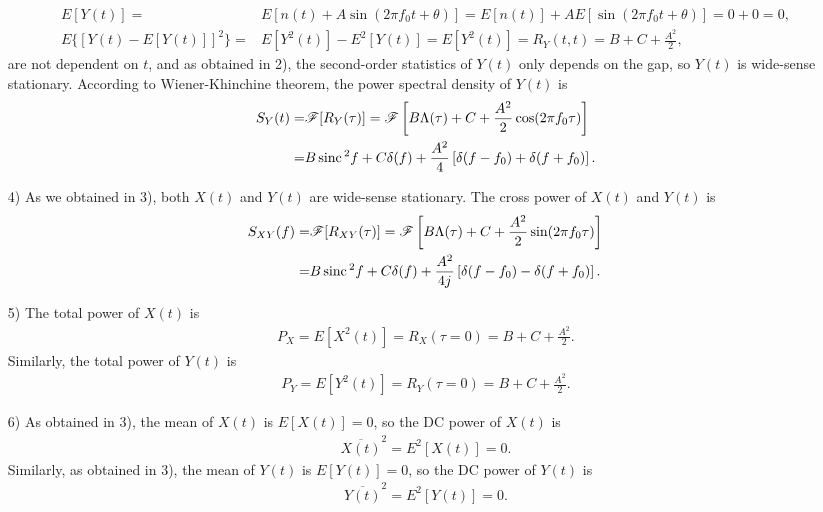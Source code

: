 \documentclass{assignment}
\begin{document}
\begin{sol}
\begin{itemize}
\begin{align}
            E[Y(t)]=&E[n(t)+A\sin(2\pi f_0t+\theta)]=E[n(t)]+AE[\sin(2\pi f_0t+\theta)]=0+0=0,\\
            E\{[Y(t)-E[Y(t)]]^2\}=&E[Y^2(t)]-E^2[Y(t)]=E[Y^2(t)]=R_Y(t,t)=B+C+\frac{A^2}{2},
        \end{align}
        are not dependent on $t$, and as obtained in 2), the second-order statistics of $Y(t)$ only depends on the gap, so $Y(t)$ is wide-sense stationary. According to Wiener-Khinchine theorem, the power spectral density of $Y(t)$ is
        \begin{align}
            \notag S_Y(t)=&\mathscr{F}[R_Y(\tau)]=\mathscr{F}\left[B\Lambda(\tau)+C+\frac{A^2}{2}\cos(2\pi f_0\tau)\right]\\
            =&B\,\text{sinc}\,^2f+C\delta(f)+\frac{A^2}{4}\left[\delta(f-f_0)+\delta(f+f_0)\right].
        \end{align}
        \item[4)] As we obtained in 3), both $X(t)$ and $Y(t)$ are wide-sense stationary. The cross power of $X(t)$ and $Y(t)$ is
        \begin{align}
            \notag S_{XY}(f)=&\mathscr{F}[R_{XY}(\tau)]=\mathscr{F}\left[B\Lambda(\tau)+C+\frac{A^2}{2}\sin(2\pi f_0\tau)\right]\\
            =&B\,\text{sinc}\,^2f+C\delta(f)+\frac{A^2}{4j}\left[\delta(f-f_0)-\delta(f+f_0)\right].
        \end{align}
        \item[5)] The total power of $X(t)$ is
        \begin{align}
            P_X=E[X^2(t)]=R_X(\tau=0)=B+C+\frac{A^2}{2}.
        \end{align}
        Similarly, the total power of $Y(t)$ is
        \begin{align}
            P_Y=E[Y^2(t)]=R_Y(\tau=0)=B+C+\frac{A^2}{2}.
        \end{align}
        \item[6)] As obtained in 3), the mean of $X(t)$ is $E[X(t)]=0$, so the DC power of $X(t)$ is
        \begin{align}
            \overline{X(t)}^2=E^2[X(t)]=0.
        \end{align}
        Similarly, as obtained in 3), the mean of $Y(t)$ is $E[Y(t)]=0$, so the DC power of $Y(t)$ is
        \begin{align}
            \overline{Y(t)}^2=E^2[Y(t)]=0.
        \end{align}
    \end{itemize}
\end{sol}
\end{document}
